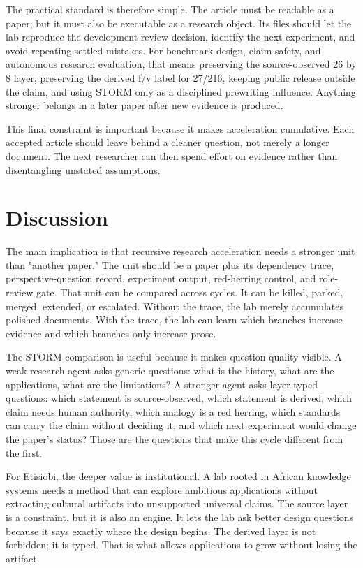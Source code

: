 \documentclass[sigconf,nonacm]{acmart}
\begin{document}
The practical standard is therefore simple. The article must be readable as a
paper, but it must also be executable as a research object. Its files should let
the lab reproduce the development-review decision, identify the next experiment,
and avoid repeating settled mistakes. For benchmark design, claim safety, and autonomous research evaluation, that means preserving the
source-observed 26 by 8 layer, preserving the derived f/v label for 27/216,
keeping public release outside the claim, and using STORM only as a disciplined
prewriting influence. Anything stronger belongs in a later paper after new
evidence is produced.

This final constraint is important because it makes acceleration cumulative.
Each accepted article should leave behind a cleaner question, not merely a
longer document. The next researcher can then spend effort on evidence rather
than disentangling unstated assumptions.


\section{Discussion}
The main implication is that recursive research acceleration needs a stronger
unit than "another paper." The unit should be a paper plus its dependency trace,
perspective-question record, experiment output, red-herring control, and role-review gate.
That unit can be compared across cycles. It can be killed, parked, merged,
extended, or escalated. Without the trace, the lab merely accumulates polished
documents. With the trace, the lab can learn which branches increase evidence
and which branches only increase prose.

The STORM comparison is useful because it makes question quality visible. A
weak research agent asks generic questions: what is the history, what are the
applications, what are the limitations? A stronger agent asks layer-typed
questions: which statement is source-observed, which statement is derived, which
claim needs human authority, which analogy is a red herring, which standards can
carry the claim without deciding it, and which next experiment would change the
paper's status? Those are the questions that make this cycle different from the
first.

For Etisiobi, the deeper value is institutional. A lab rooted in African
knowledge systems needs a method that can explore ambitious applications
without extracting cultural artifacts into unsupported universal claims. The
source layer is a constraint, but it is also an engine. It lets the lab ask
better design questions because it says exactly where the design begins. The
derived layer is not forbidden; it is typed. That is what allows applications to
grow without losing the artifact.
\end{document}
